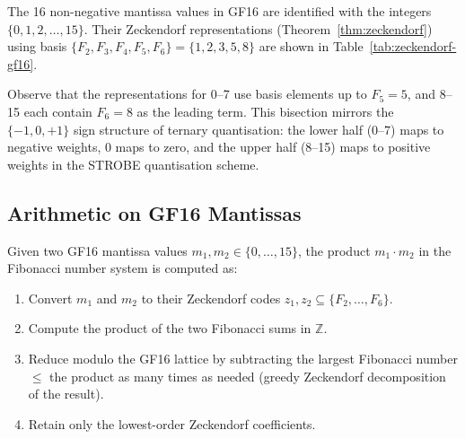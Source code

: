The 16 non-negative mantissa values in GF16 are identified with the
integers \(\{0, 1, 2, \ldots, 15\}\).  Their Zeckendorf representations
(Theorem~\ref{thm:zeckendorf}) using basis \(\{F_2,F_3,F_4,F_5,F_6\}
= \{1,2,3,5,8\}\) are shown in Table~\ref{tab:zeckendorf-gf16}.

\begin{table}[htb]
\centering
\caption{Zeckendorf representation of GF16 mantissa values 0--15.}
\label{tab:zeckendorf-gf16}
\end{table}

Observe that the representations for 0--7 use basis elements up to
\(F_5 = 5\), and 8--15 each contain \(F_6 = 8\) as the leading term.  This
bisection mirrors the \(\{-1,0,+1\}\) sign structure of ternary quantisation:
the lower half (0--7) maps to negative weights, 0 maps to zero, and the
upper half (8--15) maps to positive weights in the STROBE quantisation scheme.

\subsection{Arithmetic on GF16 Mantissas}
\label{subsec:ch7-arith}

Given two GF16 mantissa values \(m_1, m_2 \in \{0,\ldots,15\}\),
the product \(m_1 \cdot m_2\) in the Fibonacci number system is computed as:

\begin{enumerate}
  \item Convert \(m_1\) and \(m_2\) to their Zeckendorf codes
        \(z_1, z_2 \subseteq \{F_2,\ldots,F_6\}\).
  \item Compute the product of the two Fibonacci sums in \(\mathbb{Z}\).
  \item Reduce modulo the GF16 lattice by subtracting the largest
        Fibonacci number \(\leq\) the product as many times as needed
        (greedy Zeckendorf decomposition of the result).
  \item Retain only the lowest-order Zeckendorf coefficients.
\end{enumerate}

